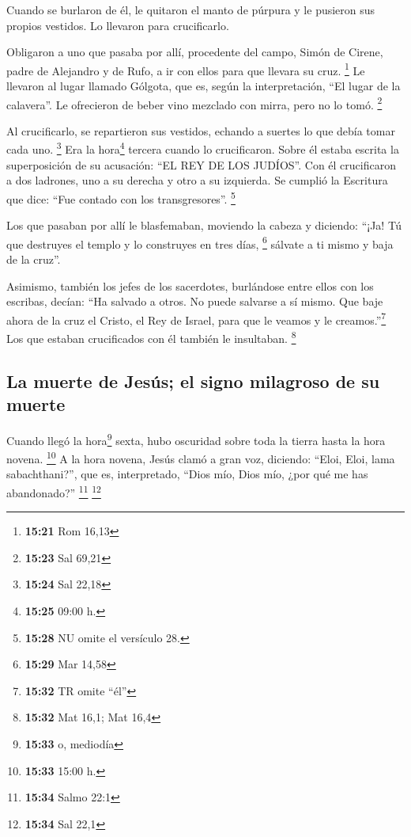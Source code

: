  Cuando se burlaron de él, le quitaron el manto de
púrpura y le pusieron sus propios vestidos. Lo llevaron para
crucificarlo.

 Obligaron a uno que pasaba por allí, procedente del
campo, Simón de Cirene, padre de Alejandro y de Rufo, a ir con ellos
para que llevara su cruz. \footnote{\textbf{15:21} Rom 16,13}
 Le llevaron al lugar llamado Gólgota, que es, según la
interpretación, ``El lugar de la calavera''.  Le
ofrecieron de beber vino mezclado con mirra, pero no lo tomó.
\footnote{\textbf{15:23} Sal 69,21}

 Al crucificarlo, se repartieron sus vestidos, echando a
suertes lo que debía tomar cada uno. \footnote{\textbf{15:24} Sal 22,18}
 Era la hora\footnote{\textbf{15:25} 09:00 h.} tercera
cuando lo crucificaron.  Sobre él estaba escrita la
superposición de su acusación: ``EL REY DE LOS JUDÍOS''. 
Con él crucificaron a dos ladrones, uno a su derecha y otro a su
izquierda.  Se cumplió la Escritura que dice: ``Fue
contado con los transgresores''. \footnote{\textbf{15:28} NU omite el
  versículo 28.}

 Los que pasaban por allí le blasfemaban, moviendo la
cabeza y diciendo: ``¡Ja! Tú que destruyes el templo y lo construyes en
tres días, \footnote{\textbf{15:29} Mar 14,58}  sálvate a
ti mismo y baja de la cruz''.

 Asimismo, también los jefes de los sacerdotes,
burlándose entre ellos con los escribas, decían: ``Ha salvado a otros.
No puede salvarse a sí mismo.  Que baje ahora de la cruz
el Cristo, el Rey de Israel, para que le veamos y le
creamos.''\footnote{\textbf{15:32} TR omite ``él''} Los que estaban
crucificados con él también le insultaban. \footnote{\textbf{15:32} Mat
  16,1; Mat 16,4}

\hypertarget{la-muerte-de-jesuxfas-el-signo-milagroso-de-su-muerte}{%
\subsection{La muerte de Jesús; el signo milagroso de su
muerte}\label{la-muerte-de-jesuxfas-el-signo-milagroso-de-su-muerte}}

 Cuando llegó la hora\footnote{\textbf{15:33} o, mediodía}
sexta, hubo oscuridad sobre toda la tierra hasta la hora novena.
\footnote{\textbf{15:33} 15:00 h.}  A la hora novena,
Jesús clamó a gran voz, diciendo: ``Eloi, Eloi, lama sabachthani?'', que
es, interpretado, ``Dios mío, Dios mío, ¿por qué me has abandonado?''
\footnote{\textbf{15:34} Salmo 22:1} \footnote{\textbf{15:34} Sal 22,1}

